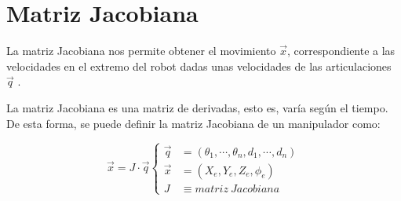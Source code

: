 \documentclass[a4paper,12pt]{article}
\begin{document}
\section{Matriz Jacobiana}
\label{sec:jacobian}

La matriz Jacobiana nos permite obtener el movimiento $\vec{x}$, correspondiente a las
velocidades en el extremo del robot dadas unas velocidades de las articulaciones $\vec{q}$
\cite{travisdewolf_robot_2013}.

La matriz Jacobiana es una matriz de derivadas, esto es, varía según el tiempo. De esta forma,
se puede definir la matriz Jacobiana de un manipulador como:

\begin{equation} \label{eq:jacobian_manipulator}
    \vec{x} = J \cdot \vec{q}
    \left\{
    \begin{aligned}
        \vec{q} & = (\theta_1, \cdots, \theta_n, d_1, \cdots, d_n) \\
        \vec{x} & = (X_e, Y_e, Z_e, \phi_e)                        \\
        J       & \equiv matriz ~ Jacobiana
    \end{aligned}
    \right.
\end{equation}
\end{document}
